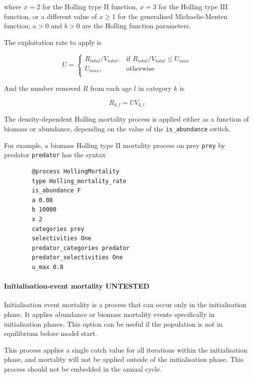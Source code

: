 where $x=2$ for the Holling type II function, $x=3$ for the Holling type III function, or a different value of $x \geq 1$ for the generalised Michaelis-Menten function; $a > 0$ and $b > 0$ are the Holling function parameters.

The exploitation rate to apply is

\begin{equation}
	U = \begin{cases}
		R_{total}/V_{total}, & \text{if $R_{total}/V_{total} \leq U_{max}$} \\
		U_{max}, & \text{otherwise}\\
	\end{cases}
\end{equation}

And the number removed $R$ from each age $l$ in category $k$ is

\begin{equation}
	R_{k,l} = U V_{k,l}
\end{equation}

The density-dependent Holling mortality process is applied either as a function of biomass or abundance, depending on the value of the \texttt{is\_abundance} switch.

For example, a biomass Holling type II mortality process on prey \texttt{prey} by predator \texttt{predator} has the syntax

{\small{\begin{verbatim}
		@process HollingMortality
		type Holling_mortality_rate
		is_abundance F
		a 0.08
		b 10000
		x 2
		categories prey
		selectivities One
		predator_categories predator
		predator_selectivities One
		u_max 0.8
\end{verbatim}}}

\paragraph{Initialisation-event mortality UNTESTED}

Initialisation event mortality is a process that can occur only in the initialisation phase. It applies abundance or biomass mortality events specifically in initialisation phases. This option can be useful if the population is not in equilibrium before model start.

This process applies a single catch value for all iterations within the initialisation phase, and mortality will not be applied outside of the initialisation phase. This process should not be embedded in the annual cycle.

